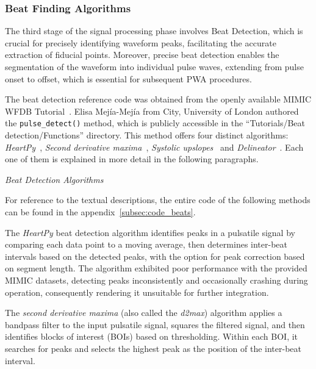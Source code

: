 \subsubsection{Beat Finding Algorithms}
\label{subsubsec:beats}

The third stage of the signal processing phase involves Beat Detection, which is crucial for precisely identifying waveform peaks, facilitating the accurate extraction of fiducial points.
Moreover, precise beat detection enables the segmentation of the waveform into individual pulse waves, extending from pulse onset to offset, which is essential for subsequent PWA procedures.

The beat detection reference code was obtained from the openly available MIMIC WFDB Tutorial~\cite{charltonMIMICWFDBTutorials2022}.
Elisa Mejía-Mejía from City, University of London authored the \texttt{pulse\_detect()} method, which is publicly accessible in the \enquote{Tutorials/Beat detection/Functions} directory.
This method offers four distinct algorithms: \textit{HeartPy}~\cite{vangentHeartPyNovelHeart2019}, \textit{Second derivative maxima}~\cite{elgendiSystolicPeakDetection2013},
\textit{Systolic upslopes}~\cite{arguellopradaNovelLowcomplexityPeak2018} and \textit{Delineator}~\cite{aboyAutomaticBeatDetection2005}.
Each one of them is explained in more detail in the following paragraphs.

\vspace{0.2cm}
\textit{Beat Detection Algorithms}
\vspace{0.2cm}

For reference to the textual descriptions, the entire code of the following methods can be found in the appendix~\ref{subsec:code_beats}.

The \textit{HeartPy} beat detection algorithm identifies peaks in a pulsatile signal by comparing each data point to a moving average,
then determines inter-beat intervals based on the detected peaks, with the option for peak correction based on segment length.
The algorithm exhibited poor performance with the provided MIMIC datasets, detecting peaks inconsistently and occasionally crashing during operation,
consequently rendering it unsuitable for further integration.

The \textit{second derivative maxima} (also called the \textit{d2max}) algorithm applies a bandpass filter to the input pulsatile signal,
squares the filtered signal, and then identifies blocks of interest (BOIs) based on thresholding.
Within each BOI, it searches for peaks and selects the highest peak as the position of the inter-beat interval.

